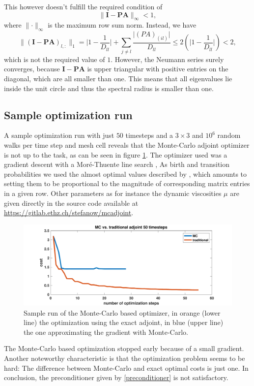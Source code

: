 \documentclass[conference]{IEEEtran}
\renewcommand*{\vec}[1]{\ensuremath{{\bm{#1}}}}
\newcommand*{\mat}[1]{\vec{#1}}
\begin{document}
This however doesn't fulfill the required condition of 
\begin{equation}
\lVert \mat{I} - \mat{PA} \lVert_\infty < 1,
\end{equation}
where $\lVert \cdot \lVert_\infty$ is the maximum row sum norm.
Instead, we have
\begin{equation}
\lVert (\mat{I} - \mat{PA})_{l, :} \lVert_1 = \lvert 1 - \frac{1}{D_{ll}} \rvert + \sum_{j \neq l} \frac{\lvert (PA)_{(il)}\rvert}{D_{ll}} \leq  2(\lvert 1 - \frac{1}{D_{ll}} \rvert) < 2, 
\end{equation}
which is not the required value of $1$.
However, the Neumann series surely converges, because 
$\mat{I} - \mat{PA}$ is upper triangular with positive entries on the diagonal, which are all smaller than one. This means that all eigenvalues lie inside the unit circle and thus the spectral radius is smaller than one.

\subsection{Sample optimization run}
A sample optimization run with just $50$ timesteps and a $3 \times 3$ and $10^6$ random walks per time step and mesh cell reveals that the Monte-Carlo adjoint optimizer is not up to the task, as can be seen in figure \ref{sampleRun}.
The optimizer used was a gradient descent with a Moré-Thuente line search \cite{morethuente},
As birth and transition probabilities we used the almost optimal values described by \cite{unsteady}, which amounts to setting them to be proportional to the magnitude of corresponding matrix entries in a given row.
Other parameters as for instance the dynamic viscosities $\mu$ are given directly in the source code available at \href{https://gitlab.ethz.ch/stefanow/mcadjoint}{https://gitlab.ethz.ch/stefanow/mcadjoint}.
\begin{figure}
	\centering
	\includegraphics[width=\linewidth]{mctrad50}
	\caption{Sample run of the Monte-Carlo based optimizer, in orange (lower line) the optimization using the exact adjoint, in blue (upper line) the one approximating the gradient with Monte-Carlo.}
	\label{sampleRun}
\end{figure}
The Monte-Carlo based optimization stopped early because of a small gradient.
Another noteworthy characteristic is that the optimization problem seems to be hard:
The difference between Monte-Carlo and exact optimal costs is just one.
In conclusion, the preconditioner given by \eqref{preconditioner} is not satisfactory.
\end{document}

